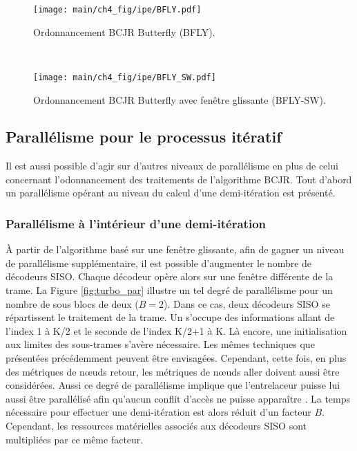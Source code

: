 
\begin{figure}[!h]
    \centering
    \begin{minipage}[t]{.49\textwidth}
	\centering
	\texttt{[image: main/ch4\_fig/ipe/BFLY.pdf]}
	\caption{Ordonnancement BCJR Butterfly (BFLY). \label{fig:siso_but}}
    \end{minipage}~~~~~~%
    \begin{minipage}[t]{0.49\textwidth}
	\centering
	\texttt{[image: main/ch4\_fig/ipe/BFLY\_SW.pdf]}
	\caption{Ordonnancement BCJR Butterfly avec fenêtre glissante (BFLY-SW). \label{fig:siso_bf_sw}}
    \end{minipage}
\end{figure}

\subsection{Parallélisme pour le processus itératif}
Il est aussi possible d'agir sur d'autres niveaux de parallélisme en plus de celui concernant l'odonnancement des traitements
de l'algorithme BCJR. Tout d'abord un 
parallélisme opérant au niveau du calcul d'une demi-itération est présenté.
\subsubsection{Parallélisme à l'intérieur d'une demi-itération}
À partir de l'algorithme basé sur une fenêtre glissante, afin de gagner un niveau de parallélisme supplémentaire, il est possible 
d'augmenter le nombre de décodeurs SISO. Chaque décodeur opère alors sur une fenêtre différente de la 
trame. La Figure \ref{fig:turbo_par} illustre un tel degré de parallélisme pour un nombre de sous blocs de deux ($B=2$).
Dans ce cas, deux décodeurs SISO se répartissent le traitement de la trame. Un s'occupe des informations allant de l'index
1 à K/2 et le seconde de l'index K/2+1 à K. Là encore, une initialisation aux limites des sous-trames s'avère nécessaire. Les mêmes 
techniques que présentées précédemment peuvent être envisagées. Cependant, cette fois, en plus des métriques de nœuds
retour, les métriques de nœuds aller doivent aussi être considérées. Aussi ce degré de parallélisme implique que 
l'entrelaceur puisse lui aussi être parallélisé afin qu’aucun conflit d'accès ne puisse apparaître 
\cite{interleaver_conflict}. 
La temps nécessaire pour effectuer une demi-itération est alors réduit d'un facteur $B$. Cependant, les ressources 
matérielles associés aux décodeurs SISO sont multipliées par ce même facteur.

